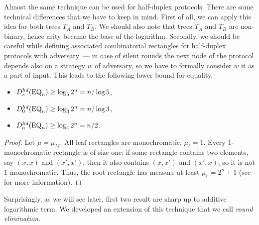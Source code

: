 Almost the same technique can be used for half-duplex protocols. 
There are some technical differences that we have to keep in mind. 
First of all, we can apply this idea for both trees $T_A$ and $T_B$. 
We should also note that trees $T_A$ and $T_B$ are non-binary, hence
arity became the base of the logarithm. 
Secondly, we should be careful while defining associated 
combinatorial rectangles for half-duplex protocols with adversary~--- 
in case of silent rounds the next node of the protocol depends also 
on a strategy $w$ of adversary, so we have to formally
consider $w$ it as a part of input. This leads to the following lower 
bound for equality.
\begin{theorem}\label{thm:private-arity-bounds-eq}
\mbox{}
\begin{itemize}
\item $D^{hd}_s(\mathrm{EQ}_n) \ge \log_5{2^n} = n/\log 5$,

\item $D^{hd}_0(\mathrm{EQ}_n) \ge \log_3{2^n} = n/\log 3$,

\item $D^{hd}_a(\mathrm{EQ}_n) \ge \log_{4}{2^n} = n/2$.
\end{itemize}
\end{theorem}
\begin{proof}
Let $\mu = \mu_M$. All leaf rectangles are monochromatic, $\mu_\ell = 1$. Every $1$-monochromatic rectangle is of size one: if some rectangle contains two elements, say $(x,x)$ and $(x',x')$, then it also contains $(x,x')$ and $(x',x)$, so it is not $1$-monochromatic. Thus, the root rectangle has measure at least $\mu_r = 2^n + 1$ (see \cite{KN97} for more information). 
\end{proof}
Surprisingly, as we will see later, first two result are sharp up to additive logarithmic term.
We developed an extension of this technique that we call \emph{round elimination}.

